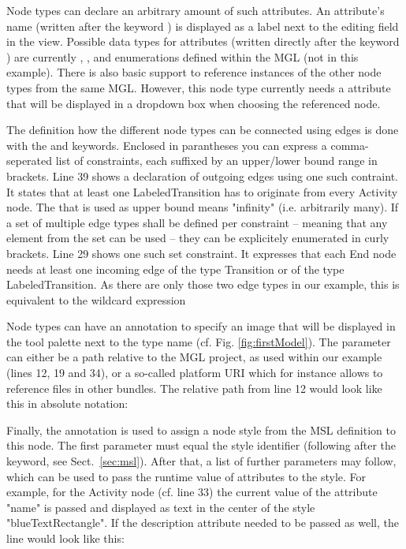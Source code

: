 \documentclass[a4paper,american,12pt]{scrreprt}
\begin{document}
Node types can declare an arbitrary amount of such attributes. An attribute's
name (written after the keyword ) is displayed as a label next to the
editing field in the  view. Possible data types for attributes
(written directly after the keyword ) are currently ,
,  and enumerations defined within the MGL (not in this
example). There is also basic support to reference instances of the other node
types from the same MGL. However, this node type currently needs a  attribute
that will be displayed in a dropdown box when choosing the referenced node.

The definition how the different node types can be connected using edges is
done with the  and  keywords\footnotemark{}.
%
%
Enclosed in parantheses you can express a comma-seperated list of constraints,
each suffixed by an upper/lower bound range in brackets. Line 39 shows a 
declaration of outgoing edges using one such contraint. It states that at least
one LabeledTransition has to originate from every Activity node. The \code{*}
that is used as upper bound means "infinity" (i.e. arbitrarily many). If a set
of multiple edge types shall be defined per constraint -- meaning that any
element from the set can be used -- they can be explicitely enumerated
in curly brackets. Line 29 shows one such set constraint. It expresses that each
End node needs at least one incoming edge of the type Transition or of the type
LabeledTransition. As there are only those two edge types in our example, this
is equivalent to the wildcard expression \code{(*[1 ,*])}

Node types can have an  annotation to specify an image that will be
displayed in the tool palette next to the type name (cf. Fig.
\ref{fig:firstModel}). The parameter can either be a path relative to the MGL
project, as used within our example (lines 12, 19 and 34), or a so-called
platform URI which for instance allows to reference files in other bundles. The
relative path from line 12 would look like this in absolute notation:


\FloatBarrier

Finally, the  annotation is used to assign a node style from the
MSL definition to this node. The first parameter must equal the style identifier
(following after the  keyword, see Sect.~\ref{sec:msl}). After
that, a list of further parameters may follow, which can be used to pass the
runtime value of attributes to the style. For example, for the Activity node
(cf. line 33) the current value of the attribute "name" is passed and displayed
as text in the center of the style "blueTextRectangle". If the description
attribute needed to be passed as well, the line would look like this:
\end{document}
